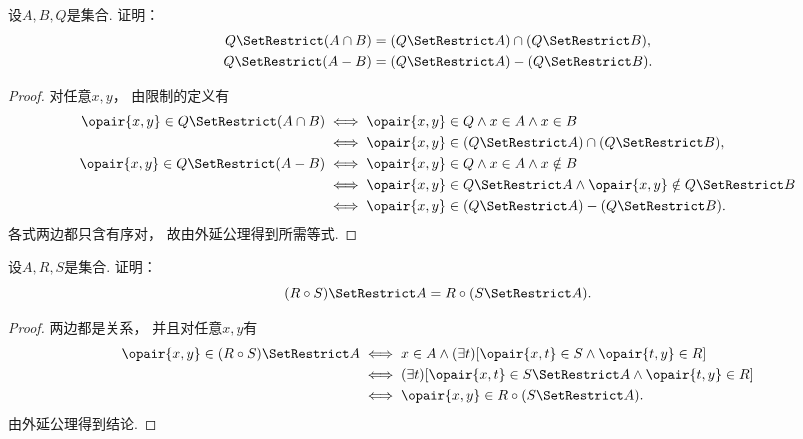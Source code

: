 \begin{example}
    设\(A,B,Q\)是集合.
    证明：
    \begin{gather}
        Q \SetRestrict (A \cap B)
        = (Q \SetRestrict A) \cap (Q \SetRestrict B), \\
        Q \SetRestrict (A - B)
        = (Q \SetRestrict A)
        - (Q \SetRestrict B).
    \end{gather}
    \begin{proof}
        对任意\(x,y\)，
        由限制的定义有
        \begin{align*}
            \opair{x,y}\in Q\SetRestrict(A\cap B)
            &\iff\opair{x,y}\in Q\land x\in A\land x\in B \\
            &\iff\opair{x,y}\in(Q\SetRestrict A)\cap(Q\SetRestrict B), \\
            \opair{x,y}\in Q\SetRestrict(A-B)
            &\iff\opair{x,y}\in Q\land x\in A\land x\notin B \\
            &\iff\opair{x,y}\in Q\SetRestrict A
            \land\opair{x,y}\notin Q\SetRestrict B \\
            &\iff\opair{x,y}\in(Q\SetRestrict A)-(Q\SetRestrict B).
        \end{align*}
        各式两边都只含有序对，
        故由外延公理得到所需等式.
    \end{proof}
\end{example}

\begin{example}
    设\(A,R,S\)是集合.
    证明：
    \begin{equation}
        (R \circ S) \SetRestrict A = R \circ (S \SetRestrict A).
    \end{equation}
    \begin{proof}
        两边都是关系，
        并且对任意\(x,y\)有
        \begin{align*}
            \opair{x,y}\in(R\circ S)\SetRestrict A
            &\iff x\in A\land(\exists t)[\opair{x,t}\in S\land\opair{t,y}\in R] \\
            &\iff(\exists t)[\opair{x,t}\in S\SetRestrict A\land\opair{t,y}\in R] \\
            &\iff\opair{x,y}\in R\circ(S\SetRestrict A).
        \end{align*}
        由外延公理得到结论.
    \end{proof}
\end{example}

